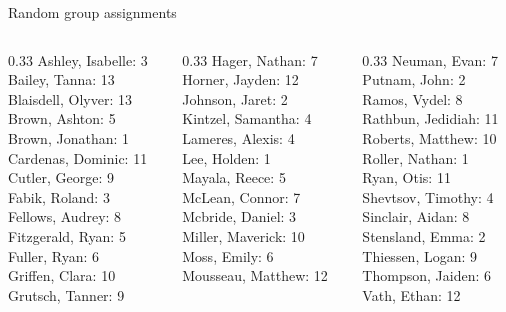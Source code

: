 \documentclass[10pt]{beamer}
\begin{document}
\begin{frame}{Random group assignments}
\begin{columns}
\begin{column}{0.33\textwidth}
Ashley, Isabelle: 3 \\ 
Bailey, Tanna: 13 \\ 
Blaisdell, Olyver: 13 \\ 
Brown, Ashton: 5 \\ 
Brown, Jonathan: 1 \\ 
Cardenas, Dominic: 11 \\ 
Cutler, George: 9 \\ 
Fabik, Roland: 3 \\ 
Fellows, Audrey: 8 \\ 
Fitzgerald, Ryan: 5 \\ 
Fuller, Ryan: 6 \\ 
Griffen, Clara: 10 \\ 
Grutsch, Tanner: 9 \\\end{column}
\begin{column}{0.33\textwidth}
Hager, Nathan: 7 \\ 
Horner, Jayden: 12 \\ 
Johnson, Jaret: 2 \\ 
Kintzel, Samantha: 4 \\ 
Lameres, Alexis: 4 \\ 
Lee, Holden: 1 \\ 
Mayala, Reece: 5 \\ 
McLean, Connor: 7 \\ 
Mcbride, Daniel: 3 \\ 
Miller, Maverick: 10 \\ 
Moss, Emily: 6 \\ 
Mousseau, Matthew: 12 \\\end{column}
\begin{column}{0.33\textwidth}
Neuman, Evan: 7 \\ 
Putnam, John: 2 \\ 
Ramos, Vydel: 8 \\ 
Rathbun, Jedidiah: 11 \\ 
Roberts, Matthew: 10 \\ 
Roller, Nathan: 1 \\ 
Ryan, Otis: 11 \\ 
Shevtsov, Timothy: 4 \\ 
Sinclair, Aidan: 8 \\ 
Stensland, Emma: 2 \\ 
Thiessen, Logan: 9 \\ 
Thompson, Jaiden: 6 \\ 
Vath, Ethan: 12 \\\end{column}
\end{columns}
\end{frame}
\end{document}
